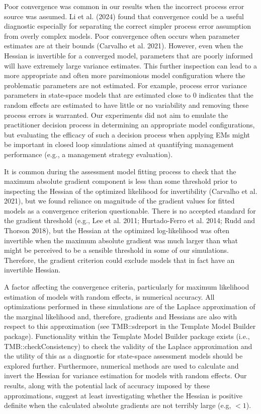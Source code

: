 \documentclass[
  12pt,
]{article}
\begin{document}
Poor convergence was common in our results when the incorrect process
error source was assumed. Li et al. (2024) found that convergence could
be a useful diagnostic especially for separating the correct simpler
process error assumption from overly complex models. Poor convergence
often occurs when parameter estimates are at their bounds (Carvalho et
al. 2021). However, even when the Hessian is invertible for a converged
model, parameters that are poorly informed will have extremely large
variance estimates. This further inspection can lead to a more
appropriate and often more parsimonious model configuration where the
problematic parameters are not estimated. For example, process error
variance parameters in state-space models that are estimated close to 0
indicates that the random effects are estimated to have little or no
variability and removing these process errors is warranted. Our
experiments did not aim to emulate the practitioner decision process in
determining an appropriate model configurations, but evaluating the
efficacy of such a decision process when applying EMs might be important
in closed loop simulations aimed at quantifying management performance
(e.g., a management strategy evaluation).

It is common during the assessment model fitting process to check that
the maximum absolute gradient component is less than some threshold
prior to inspecting the Hessian of the optimized likelihood for
invertibility (Carvalho et al. 2021), but we found reliance on magnitude
of the gradient values for fitted models as a convergence criterion
questionable. There is no accepted standard for the gradient threshold
(e.g., Lee et al. 2011; Hurtado-Ferro et al. 2014; Rudd and Thorson
2018), but the Hessian at the optimized log-likelihood was often
invertible when the maximum absolute gradient was much larger than what
might be perceived to be a sensible threshold in some of our
simulations. Therefore, the gradient criterion could exclude models that
in fact have an invertible Hessian.

A factor affecting the convergence criteria, particularly for maximum
likelihood estimation of models with random effects, is numerical
accuracy. All optimizations performed in these simulations are of the
Laplace approximation of the marginal likelihood and, therefore,
gradients and Hessians are also with respect to this approximation (see
TMB::sdreport in the Template Model Builder package). Functionality
within the Template Model Builder package exists (i.e.,
TMB::checkConsistency) to check the validity of the Laplace
approximation and the utility of this as a diagnostic for state-space
assessment models should be explored further. Furthermore, numerical
methods are used to calculate and invert the Hessian for variance
estimation for models with random effects. Our results, along with the
potential lack of accuracy imposed by these approximations, suggest at
least investigating whether the Hessian is positive definite when the
calculated absolute gradients are not terribly large (e.g, \(< 1\)).
\end{document}
